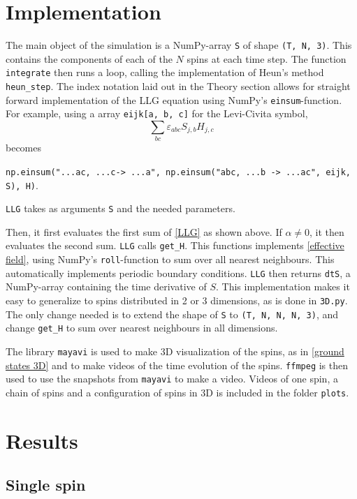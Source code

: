 \documentclass{article}
\begin{document}
    \section*{Implementation}
    The main object of the simulation is a NumPy-array \verb|S| of shape \verb|(T, N, 3)|.
    This contains the components of each of the $N$ spins at each time step.
    The function \verb|integrate| then runs a loop, calling the implementation of Heun's method \verb|heun_step|.
    The index notation laid out in the Theory section allows for straight forward implementation of the LLG equation using NumPy's \verb|einsum|-function.
    For example, using a array \verb|eijk[a, b, c]| for the Levi-Civita symbol, 
    $$
    \sum_{b c}\varepsilon_{abc}S_{j, b}H_{j,c}
    $$
    becomes
    \begin{center}
        \verb|np.einsum("...ac, ...c-> ...a", np.einsum("abc, ...b -> ...ac", eijk, S), H)|.

    \end{center}

    \verb|LLG| takes as arguments \verb|S| and the needed parameters.

    Then, it first evaluates the first sum of \autoref{LLG} as shown above.
    If $\alpha \neq 0$, it then evaluates the second sum.
    \verb|LLG| calls \verb|get_H|.
    This functions implements \autoref{effective field}, using NumPy's \verb|roll|-function to sum over all nearest neighbours.
    This automatically implements periodic boundary conditions.
    \verb|LLG| then returns \verb|dtS|, a NumPy-array containing the time derivative of $S$.
    This implementation makes it easy to generalize to spins distributed in 2 or 3 dimensions, as is done in \verb|3D.py|.
    The only change needed is to extend the shape of \verb|S| to \verb|(T, N, N, N, 3)|, and change \verb|get_H| to sum over nearest neighbours in all dimensions.

    The library \verb|mayavi| is used to make 3D visualization of the spins, as in \autoref{ground states 3D} and to make videos of the time evolution of the spins.
    \verb|ffmpeg| is then used to use the snapshots from \verb|mayavi| to make a video.
    Videos of one spin, a chain of spins and a configuration of spins in 3D is included in the folder \verb|plots|.


    \section*{Results}
    \subsection*{Single spin}
\end{document}
